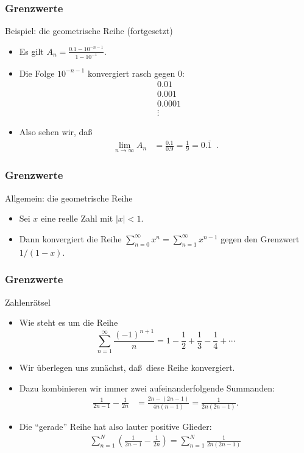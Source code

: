 \documentclass{beamer}
\newcommand\bc[1]{\left({#1}\right)}
\renewcommand{\ae}{\"a}
\newcommand{\ue}{\"u}
\newcommand{\mytitle}{Grenzwerte}
\begin{document}
\begin{frame}\frametitle{\mytitle}
	\begin{block}{Beispiel: die geometrische Reihe (fortgesetzt)}
		\begin{itemize}
			\item Es gilt $\displaystyle A_n=\frac{0.1-10^{-n-1}}{1-10^{-1}}.  $
			\item Die Folge $10^{-n-1}$ konvergiert rasch gegen 0:
				\begin{align*}
				&0.01\\
				&0.001\\
				&0.0001\\
				&\vdots
				\end{align*}
			\item Also sehen wir, da\ss
				\begin{align*}
					\lim_{n\to\infty}A_n&=\frac{0.1}{0.9}=\frac{1}{9}=0.\overline 1\enspace.
				\end{align*}
		\end{itemize}
	\end{block}
\end{frame}

\begin{frame}\frametitle{\mytitle}
	\begin{block}{Allgemein: die geometrische Reihe}
		\begin{itemize}
			\item Sei $x$ eine reelle Zahl mit $|x|<1$.
			\item Dann konvergiert die Reihe $\sum_{n=0}^\infty x^n=\sum_{n=1}^\infty x^{n-1}$ gegen den Grenzwert $1/(1-x)$.
		\end{itemize}
	\end{block}
\end{frame}

\begin{frame}\frametitle{\mytitle}
	\begin{block}{Zahlenr\ae tsel}
		\begin{itemize}
			\item Wie steht es um die Reihe
				$$\sum_{n=1}^\infty\frac{(-1)^{n+1}}n=1-\frac{1}{2}+\frac{1}{3}-\frac{1}{4}+\cdots$$
			\item Wir \ue berlegen uns zun\ae chst, da\ss\ diese Reihe konvergiert.
			\item Dazu kombinieren wir immer zwei aufeinanderfolgende Summanden:
				\begin{align*}
					\frac{1}{2n-1}-\frac{1}{2n}&=\frac{2n-(2n-1)}{4n(n-1)}=\frac{1}{2n(2n-1)}.
				\end{align*}
			\item Die ``gerade'' Reihe hat also lauter positive Glieder:
				\begin{align*}
					\sum_{n=1}^{N}\bc{\frac{1}{2n-1}-\frac{1}{2n}}=\sum_{n=1}^N\frac{1}{2n(2n-1)}
				\end{align*}
		\end{itemize}
	\end{block}
\end{frame}
\end{document}

